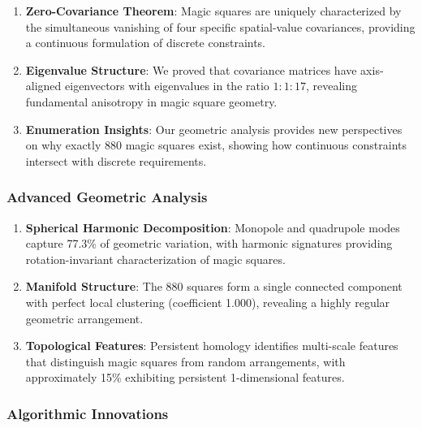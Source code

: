 \begin{enumerate}
    \item \textbf{Zero-Covariance Theorem}: Magic squares are uniquely characterized by the simultaneous vanishing of four specific spatial-value covariances, providing a continuous formulation of discrete constraints.
    
    \item \textbf{Eigenvalue Structure}: We proved that covariance matrices have axis-aligned eigenvectors with eigenvalues in the ratio $1:1:17$, revealing fundamental anisotropy in magic square geometry.
    
    \item \textbf{Enumeration Insights}: Our geometric analysis provides new perspectives on why exactly 880 magic squares exist, showing how continuous constraints intersect with discrete requirements.
\end{enumerate}

\subsubsection{Advanced Geometric Analysis}

\begin{enumerate}
    \item \textbf{Spherical Harmonic Decomposition}: Monopole and quadrupole modes capture 77.3\% of geometric variation, with harmonic signatures providing rotation-invariant characterization of magic squares.
    
    \item \textbf{Manifold Structure}: The 880 squares form a single connected component with perfect local clustering (coefficient 1.000), revealing a highly regular geometric arrangement.
    
    \item \textbf{Topological Features}: Persistent homology identifies multi-scale features that distinguish magic squares from random arrangements, with approximately 15\% exhibiting persistent 1-dimensional features.
\end{enumerate}

\subsubsection{Algorithmic Innovations}


